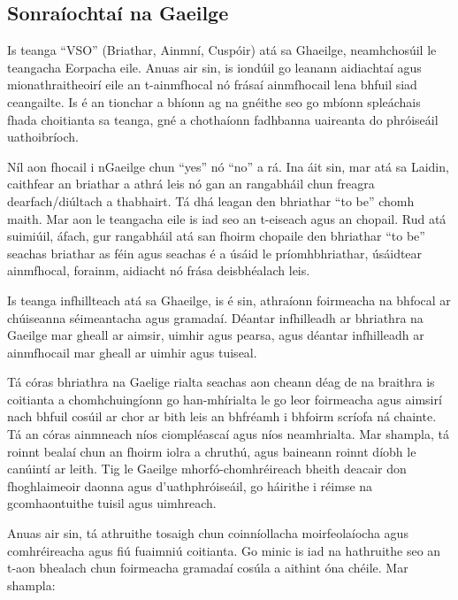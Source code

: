 \documentclass[]{../../metanetpaper}
\begin{document}
\begin{multicols}{2}
\subsection{Sonraíochtaí na Gaeilge}

Is teanga ``VSO'' (Briathar, Ainmní, Cuspóir) atá sa Ghaeilge, neamhchosúil le teangacha Eorpacha eile. Anuas air sin, is iondúil go leanann aidiachtaí agus mionathraitheoirí eile an t-ainmfhocal nó frásaí ainmfhocail lena bhfuil siad ceangailte. Is é an tionchar a bhíonn ag na gnéithe seo go mbíonn spleáchais fhada choitianta sa teanga, gné a chothaíonn fadhbanna uaireanta do phróiseáil uathoibríoch.


Níl aon fhocail i nGaeilge chun ``yes'' nó ``no'' a rá. Ina áit sin, mar atá sa Laidin, caithfear an briathar a athrá leis nó gan an rangabháil chun freagra dearfach/diúltach a thabhairt. Tá dhá leagan den bhriathar ``to be'' chomh maith. Mar aon le teangacha eile is iad seo an t-eiseach agus an chopail. Rud atá suimiúil, áfach, gur rangabháil atá san fhoirm chopaile den bhriathar ``to be'' seachas briathar as féin agus seachas é a úsáid le príomhbhriathar, úsáidtear ainmfhocal, forainm, aidiacht nó frása deisbhéalach leis.

Is teanga infhillteach atá sa Ghaeilge, is é sin, athraíonn foirmeacha na bhfocal ar chúiseanna séimeantacha agus gramadaí. Déantar infhilleadh ar bhriathra na Gaeilge mar gheall ar aimsir, uimhir agus pearsa, agus déantar infhilleadh ar ainmfhocail mar gheall ar uimhir agus tuiseal.  

Tá córas bhriathra na Gaelige rialta seachas aon cheann déag de na braithra is coitianta a chomhchuingíonn go han-mhírialta le go leor foirmeacha agus aimsirí nach bhfuil cosúil ar chor ar bith leis an bhfréamh i bhfoirm scríofa ná chainte. Tá an córas ainmneach níos ciompléascaí agus níos neamhrialta. Mar shampla, tá roinnt bealaí chun an fhoirm iolra a chruthú, agus baineann roinnt díobh le canúintí ar leith. Tig le Gaeilge mhorfó-chomhréireach bheith deacair don fhoghlaimeoir daonna agus d’uathphróiseáil, go háirithe i réimse na gcomhaontuithe tuisil agus uimhreach.

Anuas air sin, tá athruithe tosaigh chun coinníollacha moirfeolaíocha agus comhréireacha agus fiú fuaimniú coitianta. Go minic is iad na hathruithe seo an t-aon bhealach chun foirmeacha gramadaí cosúla a aithint óna chéile. Mar shampla:



\end{multicols}
\end{document}
